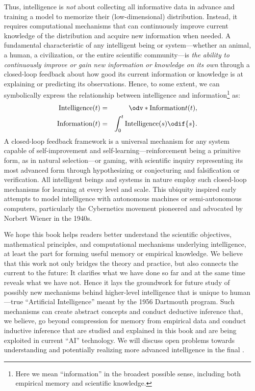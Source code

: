 \documentclass[../../book-main.tex]{subfiles}
\begin{document}
Thus, intelligence is \textit{not} about collecting all informative
data in advance and training a model to memorize their
(low-dimensional) distribution. Instead, it requires computational
mechanisms that can continuously improve current knowledge of the
distribution and acquire new information when needed. A fundamental
characteristic of any intelligent being or system---whether an
animal, a human, a civilization, or the entire scientific
community---is \textit{the ability to continuously improve or gain
new information or knowledge on its own} through a closed-loop
feedback about how good its current information or knowledge is at explaining or
predicting its observations. Hence, to some extent, we can
symbolically express the relationship between intelligence and
information\footnote{Here we mean ``information'' in the broadest
    possible sense, including both empirical memory and scientific
knowledge.} as:
\begin{eqnarray*}
    \operatorname{Intelligence}(t) &=&
    \odv*{\operatorname{Information}}{t}(t), \\
    \operatorname{Information}(t)  &=& \int_{0}^{t}
    \operatorname{Intelligence}(s) \odif{s}.
\end{eqnarray*}
A closed-loop feedback framework is a universal mechanism for any
system capable of self-improvement and self-learning---reinforcement
being a primitive form, as in natural selection---or gaming, with
scientific inquiry representing its most advanced form through
hypothesizing or conjecturing and falsification or verification. All
intelligent beings and systems in nature employ such closed-loop
mechanisms for learning at
every level and scale. This ubiquity inspired early attempts to model
intelligence with autonomous machines or semi-autonomous computers,
particularly the
Cybernetics movement pioneered and advocated by Norbert Wiener in the 1940s.

We hope this book helps readers better understand the scientific
objectives, mathematical  principles, and computational mechanisms
underlying intelligence, at least the part for forming useful memory
or empirical knowledge. We
believe that this work not only bridges the theory and practice, but
also connects the current to the future: It clarifies what we have
done so far and at the same time reveals what we have not. Hence it
lays the groundwork for
future study of possibly new mechanisms behind higher-level
intelligence that is unique to human---true ``Artificial
Intelligence'' meant by the 1956 Dartmouth program. Such mechanisms
can create abstract concepts and conduct deductive inference that, we
believe, go beyond compression for memory from empirical data and
conduct inductive inference that are studied and explained in this
book and are being exploited in current ``AI'' technology. We will
discuss open problems
towards understanding and potentially realizing more advanced
intelligence in the final .
\end{document}
